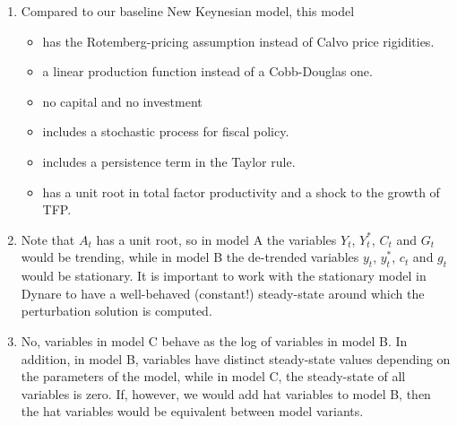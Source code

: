 \begin{enumerate}

\item Compared to our baseline New Keynesian model, this model
    \begin{itemize}
    \item has the Rotemberg-pricing assumption instead of Calvo price rigidities.
    \item a linear production function instead of a Cobb-Douglas one.
    \item no capital and no investment
    \item includes a stochastic process for fiscal policy.
    \item includes a persistence term in the Taylor rule.
    \item has a unit root in total factor productivity and a shock to the growth of TFP.
\end{itemize}
  
\item Note that $A_t$ has a unit root, so in model A the variables $Y_t$, $Y_t^*$, $C_t$ and $G_t$ would be trending,
  while in model B the de-trended variables $y_t$, $y_t^*$, $c_t$ and $g_t$ would be stationary.
It is important to work with the stationary model in Dynare to have a well-behaved (constant!) steady-state
  around which the perturbation solution is computed.

\item No, variables in model C behave as the log of variables in model B.
In addition, in model B, variables have distinct steady-state values depending on the parameters of the model,
  while in model C, the steady-state of all variables is zero.
If, however, we would add hat variables to model B,
  then the hat variables would be equivalent between model variants.


\end{enumerate}
